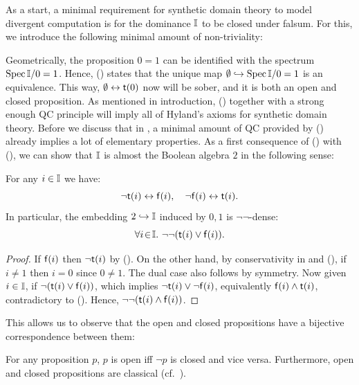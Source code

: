 As a start, a minimal requirement for synthetic domain theory to model divergent computation is for the dominance $\mathbb{I}$ to be closed under falsum. For this, we introduce the following minimal amount of non-triviality:

\PrintAxiomNT

Geometrically, the proposition $0 = 1$ can be identified with the spectrum $\operatorname{Spec}\mathbb{I}/0=1$. Hence, (\AxiomNT) states that the unique map $\emptyset \hookrightarrow \operatorname{Spec}\mathbb{I}/0=1$ is an equivalence.
This way, $\emptyset \leftrightarrow \mathsf{t}(0)$ now will be sober, and it is both an open and closed proposition. As mentioned in introduction, (\AxiomNT) together with a strong enough \gls{QC} principle will imply all of Hyland's axioms for synthetic domain theory. Before we discuss that in , a minimal amount of \gls{QC} provided by (\AxiomSQCI) already implies a lot of elementary properties. As a first consequence of (\AxiomNT) with (\AxiomSQCI), we can show that $\mathbb{I}$ is almost the Boolean algebra $2$ in the following sense:

\begin{proposition}[\AxiomNT, \AxiomSQCID]\label{prop:filed}
  For any $i \in \mathbb{I}$ we have:
  \[ \neg \mathsf{t}(i) \leftrightarrow \mathsf{f}(i), \quad \neg\mathsf{f}(i) \leftrightarrow \mathsf{t}(i)\text{.} \]
  In particular, the embedding $2 \hookrightarrow \mathbb{I}$ induced by $0,1$ is $\neg\neg$-dense:
  \[ \forall i\!\in\!\mathbb{I}.\  \neg\neg(\mathsf{t}(i) \vee \mathsf{f}(i))\text{.} \]
\end{proposition}
\begin{proof}
  If $\mathsf{f}(i)$ then $\neg\mathsf{t}(i)$ by (\AxiomNT). On the other hand, by conservativity in  and (\AxiomNT), if $i \neq 1$ then $i = 0$ since $0 \neq 1$. The dual case also follows by symmetry. Now given $i\in\mathbb{I}$, if $\neg(\mathsf{t}(i) \vee \mathsf{f}(i))$, which implies $\neg\mathsf{t}(i) \vee \neg\mathsf{f}(i)$, equivalently $\mathsf{f}(i) \wedge \mathsf{t}(i)$, contradictory to (\AxiomNT). Hence, $\neg\neg(\mathsf{t}(i) \wedge \mathsf{f}(i))$.
\end{proof}

This allows us to observe that the open and closed propositions have a bijective correspondence between them:

\begin{corollary}[\AxiomNT, \AxiomSQCID]\label{cor:opendnegclose}
  For any proposition $p$, $p$ is open iff $\neg p$ is closed and vice versa. Furthermore, open and closed propositions are classical (cf.~).
\end{corollary}

